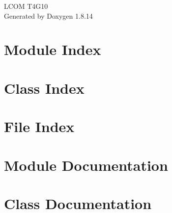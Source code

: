 \documentclass[twoside]{book}
\newcommand{\+}{\discretionary{\mbox{\scriptsize$\hookleftarrow$}}{}{}}
\newcommand{\clearemptydoublepage}{%
  \newpage{\pagestyle{empty}\cleardoublepage}%
}
\begin{document}
\hypersetup{pageanchor=false,
             bookmarksnumbered=true,
             pdfencoding=unicode
            }
\begin{titlepage}
\vspace*{7cm}
\begin{center}%
{\Large L\+C\+OM T4\+G10 }\\
\vspace*{1cm}
{\large Generated by Doxygen 1.8.14}\\
\end{center}
\end{titlepage}
\clearemptydoublepage
{}
\tableofcontents
\clearemptydoublepage
{}
\hypersetup{pageanchor=true}

\chapter{Module Index}

\chapter{Class Index}

\chapter{File Index}

\chapter{Module Documentation}





























\chapter{Class Documentation}
































\end{document}
